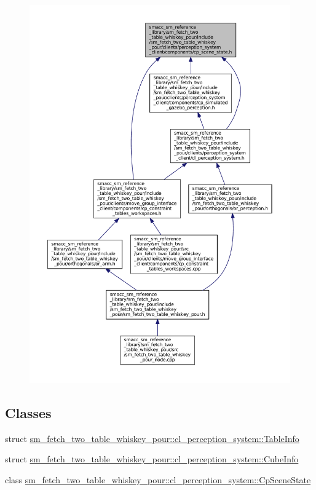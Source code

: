 \begin{figure}[H]
\begin{center}
\leavevmode
\includegraphics[width=350pt]{sm__fetch__two__table__whiskey__pour_2include_2sm__fetch__two__table__whiskey__pour_2clients_2pe343a45016515e0d66d13486cf7da1ea9}
\end{center}
\end{figure}
\subsection*{Classes}
\begin{DoxyCompactItemize}
\item 
struct \hyperlink{structsm__fetch__two__table__whiskey__pour_1_1cl__perception__system_1_1TableInfo}{sm\+\_\+fetch\+\_\+two\+\_\+table\+\_\+whiskey\+\_\+pour\+::cl\+\_\+perception\+\_\+system\+::\+Table\+Info}
\item 
struct \hyperlink{structsm__fetch__two__table__whiskey__pour_1_1cl__perception__system_1_1CubeInfo}{sm\+\_\+fetch\+\_\+two\+\_\+table\+\_\+whiskey\+\_\+pour\+::cl\+\_\+perception\+\_\+system\+::\+Cube\+Info}
\item 
class \hyperlink{classsm__fetch__two__table__whiskey__pour_1_1cl__perception__system_1_1CpSceneState}{sm\+\_\+fetch\+\_\+two\+\_\+table\+\_\+whiskey\+\_\+pour\+::cl\+\_\+perception\+\_\+system\+::\+Cp\+Scene\+State}
\end{DoxyCompactItemize}
